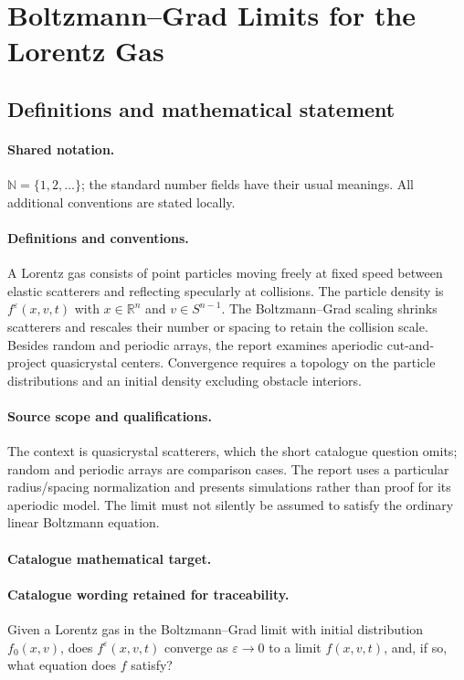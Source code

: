 \documentclass[11pt]{article}
\begin{document}
\section{Boltzmann–Grad Limits for the Lorentz Gas}\label{statement}

\subsection{Definitions and mathematical statement}

\paragraph{Shared notation.}$\mathbb N=\{1,2,\ldots\}$; the standard number fields have their usual meanings. All additional conventions are stated locally.


\paragraph{Definitions and conventions.} A Lorentz gas consists of point particles moving freely at fixed speed between elastic scatterers and reflecting specularly at collisions. The particle density is $f^\varepsilon(x,v,t)$ with $x\in\mathbb R^n$ and $v\in S^{n-1}$. The Boltzmann--Grad scaling shrinks scatterers and rescales their number or spacing to retain the collision scale. Besides random and periodic arrays, the report examines aperiodic cut-and-project quasicrystal centers. Convergence requires a topology on the particle distributions and an initial density excluding obstacle interiors.

\paragraph{Source scope and qualifications.} The context is quasicrystal scatterers, which the short catalogue question omits; random and periodic arrays are comparison cases. The report uses a particular radius/spacing normalization and presents simulations rather than proof for its aperiodic model. The limit must not silently be assumed to satisfy the ordinary linear Boltzmann equation.

\paragraph{Catalogue mathematical target.}
\paragraph{Catalogue wording retained for traceability.}
Given a Lorentz gas in the Boltzmann–Grad limit with initial distribution $f_0(x,v)$, does $f^\varepsilon(x,v,t)$ converge as $\varepsilon\to0$ to a limit $f(x,v,t)$, and, if so, what equation does $f$ satisfy?
\end{document}
